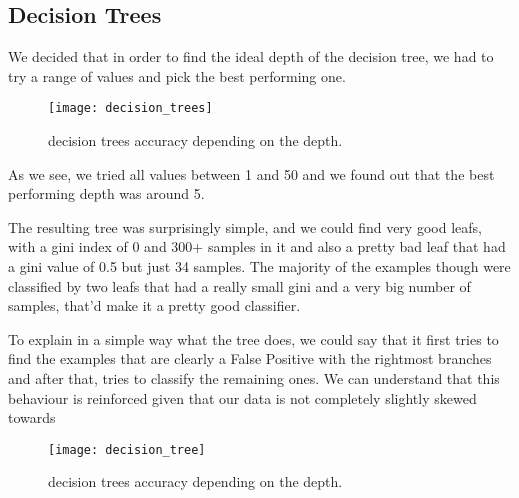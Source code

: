 
\subsection{Decision Trees}%
\label{sub:decision-trees}
We decided that in order to find the ideal depth of the decision tree, we had to try a range of values and pick the best performing one.

\begin{figure}[H]
    \centering
    \texttt{[image: decision\_trees]}
    \caption{decision trees accuracy depending on the depth.}%
    \label{fig:decision_trees_acc}
\end{figure}

As we see, we tried all values between 1 and 50 and we found out that the best performing depth was around 5. 

The resulting tree was surprisingly simple, and we could find very good leafs, with a gini index of 0 and 300+ samples in it and also a pretty bad leaf that had a gini value of 0.5 but just 34 samples. The majority of the examples though were classified by two leafs that had a really small gini and a very big number of samples, that'd make it a pretty good classifier.

To explain in a simple way what the tree does, we could say that it first tries to find the examples that are clearly a False Positive with the rightmost branches and after that, tries to classify the remaining ones. We can understand that this behaviour is reinforced given that our data is not completely  slightly skewed towards 

\begin{figure}[H]
    \centering
    \texttt{[image: decision\_tree]}
    \caption{decision trees accuracy depending on the depth.}%
    \label{fig:decision_trees}
\end{figure}

